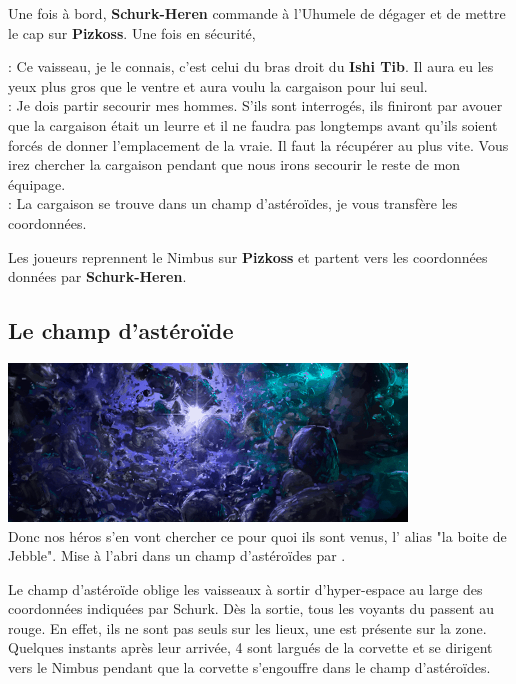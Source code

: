 Une fois à bord, \textbf{Schurk-Heren} commande à l’Uhumele de dégager et de mettre le cap sur \textbf{Pizkoss}. Une fois en sécurité, 
\begin{quotebox}
    : Ce vaisseau, je le connais, c’est celui du bras droit du \textbf{Ishi Tib}. Il aura eu les yeux plus gros que le ventre et aura voulu la cargaison pour lui seul.\\
    : Je dois partir secourir mes hommes. S’ils sont interrogés, ils finiront par avouer que la cargaison était un leurre et il ne faudra pas longtemps avant qu’ils soient forcés de donner l’emplacement de la vraie. Il faut la récupérer au plus vite. Vous irez chercher la cargaison pendant que nous irons secourir le reste de mon équipage.\\
    : La cargaison se trouve dans un champ d’astéroïdes, je vous transfère les coordonnées.
\end{quotebox}

Les joueurs reprennent le Nimbus sur \textbf{Pizkoss} et partent vers les coordonnées données par \textbf{Schurk-Heren}.

\subsection{Le champ d’astéroïde}
\noindent\includegraphics[width=\linewidth]{_img/places/asteroid-field.png}\\

Donc nos héros s’en vont chercher ce pour quoi ils sont venus, l’ alias "la boite de Jebble". Mise à l’abri dans un champ d’astéroïdes par .

Le champ d’astéroïde oblige les vaisseaux à sortir d’hyper-espace au large des coordonnées indiquées par Schurk. Dès la sortie, tous les voyants du  passent au rouge. En effet, ils ne sont pas seuls sur les lieux, une  est présente sur la zone. Quelques instants après leur arrivée, 4  sont largués de la corvette et se dirigent vers le Nimbus pendant que la corvette s’engouffre dans le champ d’astéroïdes.


